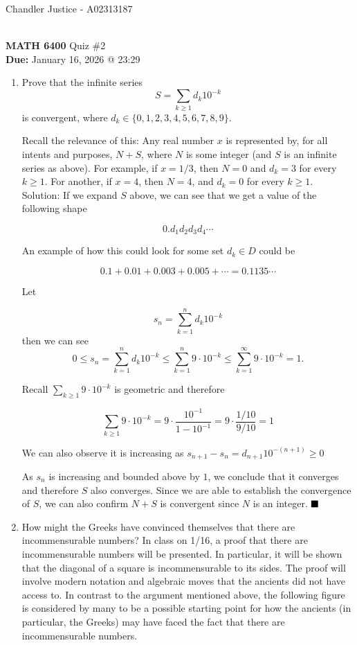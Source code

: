 \documentclass[10pt]{article}
\newcommand{\solution}{\color{blue} Solution: \color{black}}
\begin{document}
\begin{flushright}
Chandler Justice - A02313187
\end{flushright}
\noindent \underline{\hspace{3in}}\\
\textbf{MATH 6400} Quiz \#2\\
\textbf{Due:} January 16, 2026 @ 23:29\\

	\begin{enumerate}
		\item Prove that the infinite series 
		$$S= \sum_{k \geq 1} d_k10^{-k}$$
		is convergent, where $d_k \in \{0,1,2,3,4,5,6,7,8,9\}$. 
		
		Recall the relevance of this: Any real number $x$ is represented by, for all intents and purposes, $N+S$, where $N$ is some integer (and $S$ is an infinite series as above).  
		For example, if $x = 1/3$, then $N = 0$ and $d_k = 3$ for every $k \geq 1$.
		For another, if $x = 4$, then $N = 4$, and $d_k = 0$ for every $k \geq 1$. \\

        \solution If we expand $S$ above, we can see that we get a value of the following shape

        \[0.d_1d_2d_3d_4\cdots\]

        An example of how this could look for some set $d_k \in D$ could be

        \[0.1 + 0.01 + 0.003 + 0.005 + \cdots = 0.1135\cdots\]

 Let

    \[s_n = \sum_{k = 1}^n d_k 10^{-k}\]
    then we can see
\[0 \leq s_n = \sum_{k = 1}^n d_k 10^{-k} \leq \sum_{k = 1}^n 9 \cdot 10^{-k} \leq \sum_{k = 1}^\infty 9 \cdot 10^{-k} = 1.\]

Recall $\sum_{k \geq 1} 9 \cdot 10^{-k}$ is geometric and therefore

\[\sum_{k \geq 1} 9 \cdot 10^{-k} = 9 \cdot \frac{10^{-1}}{1 - 10^{-1}} = 9 \cdot \frac{1/10}{9/10} = 1\]
    
We can also observe it is increasing as $s_{n + 1} - s_n = d_{n+1} 10^{-(n + 1)} \geq 0$

    As $s_n$ is increasing and bounded above by $1$, we conclude that it converges and therefore $S$ also converges. Since we are able to establish the convergence of $S$, we can also confirm $N + S$ is convergent since $N$ is an integer. $\hfill\blacksquare$ 
		
		\item How might the Greeks have convinced themselves that there are incommensurable numbers?  
		In class on 1/16, a proof that there are incommensurable numbers will be presented.  In particular, it will be shown that the diagonal of a square is incommensurable to its sides.  
		The proof will involve modern notation and algebraic moves that the ancients did not have access to.  
		In contrast to the argument mentioned above, the following figure is considered by many to be a possible starting point 
		for how the ancients (in particular, the Greeks) may have faced the fact that there are incommensurable numbers.  
		

\end{enumerate}
\end{document}
